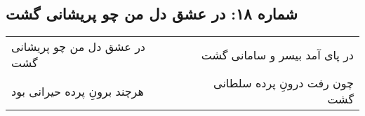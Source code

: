 \begin{center}
\section*{شماره ۱۸: در عشق دل من چو پریشانی گشت}
\label{sec:018}
\begin{longtable}{l p{0.5cm} r}
در عشق دل من چو پریشانی گشت
&&
در پای آمد بیسر و سامانی گشت
\\
هرچند برونِ پرده حیرانی بود
&&
چون رفت درونِ پرده سلطانی گشت
\\
\end{longtable}
\end{center}
